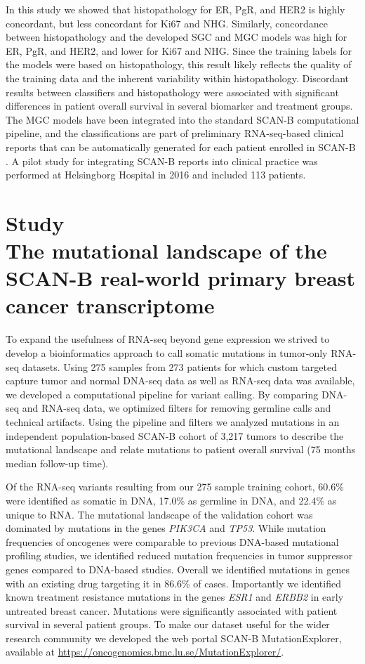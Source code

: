 \documentclass[11pt]{book}
\newcommand{\scanb}{\mbox{SCAN-B}}
\begin{document}
In this study we showed that histopathology for ER, PgR, and HER2 is highly concordant, but less concordant for Ki67 and NHG. Similarly, concordance between histopathology and the developed SGC and MGC models was high for ER, PgR, and HER2, and lower for Ki67 and NHG. Since the training labels for the models were based on histopathology, this result likely reflects the quality of the training data and the inherent variability within histopathology. Discordant results between classifiers and histopathology were associated with significant differences in patient overall survival in several biomarker and treatment groups. The MGC models have been integrated into the standard \scanb{} computational pipeline, and the classifications are part of preliminary RNA-seq-based clinical reports that can be automatically generated for each patient enrolled in \scanb{} \cite{Base:2009, Reggie:2016}. A pilot study for integrating \scanb{} reports into clinical practice was performed at Helsingborg Hospital in 2016 and included 113 patients.

\newpage
\section*{Study \IV \\ The mutational landscape of the SCAN-B real-world primary breast cancer transcriptome}

To expand the usefulness of RNA-seq beyond gene expression we strived to develop a bioinformatics approach to call somatic mutations in tumor-only RNA-seq datasets. Using 275 samples from 273 patients for which custom targeted capture tumor and normal DNA-seq data as well as RNA-seq data was available, we developed a computational pipeline for variant calling. By comparing DNA-seq and RNA-seq data, we optimized filters for removing germline calls and technical artifacts. Using the pipeline and filters we analyzed mutations in an independent population-based \scanb{} cohort of 3,217 tumors to describe the mutational landscape and relate mutations to patient overall survival (75 months median follow-up time).

Of the RNA-seq variants resulting from our 275 sample training cohort, 60.6\% were identified as somatic in DNA, 17.0\% as germline in DNA, and 22.4\% as unique to RNA. The mutational landscape of the validation cohort was dominated by mutations in the genes \textit{PIK3CA} and \textit{TP53}. While mutation frequencies of oncogenes were comparable to previous DNA-based mutational profiling studies, we identified reduced mutation frequencies in tumor suppressor genes compared to DNA-based studies. Overall we identified mutations in genes with an existing drug targeting it in 86.6\% of cases. Importantly we identified known treatment resistance mutations in the genes \textit{ESR1} and \textit{ERBB2} in early untreated breast cancer. Mutations were significantly associated with patient survival in several patient groups. To make our dataset useful for the wider research community we developed the web portal \scanb{} MutationExplorer, available at \url{https://oncogenomics.bmc.lu.se/MutationExplorer/}.
\end{document}
